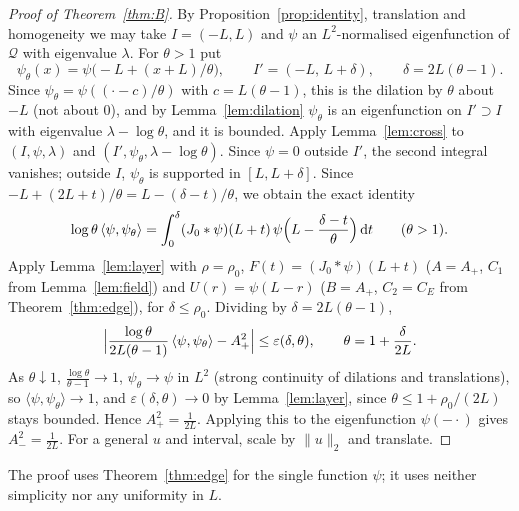 \documentclass[11pt]{amsart}
\newcommand{\eps}{\varepsilon}
\newcommand{\dd}{\,\mathrm{d}}
\theoremstyle{definition}
\theoremstyle{remark}
\numberwithin{equation}{section}
\begin{document}
\begin{proof}[Proof of Theorem~\ref{thm:B}]
By Proposition~\ref{prop:identity}, translation and homogeneity we may take $I=(-L,L)$ and $\psi$ an $L^2$-normalised eigenfunction of $\mathcal Q$ with eigenvalue $\lambda$. For $\theta>1$ put
\[
\psi_\theta(x)=\psi\bigl(-L+(x+L)/\theta\bigr),\qquad I'=(-L,\,L+\delta),\qquad\delta=2L(\theta-1).
\]
Since $\psi_\theta=\psi((\cdot-c)/\theta)$ with $c=L(\theta-1)$, this is the dilation by $\theta$ about $-L$ (not about $0$), and by Lemma~\ref{lem:dilation} $\psi_\theta$ is an eigenfunction on $I'\supset I$ with eigenvalue $\lambda-\log\theta$, and it is bounded. Apply Lemma~\ref{lem:cross} to $(I,\psi,\lambda)$ and $(I',\psi_\theta,\lambda-\log\theta)$. Since $\psi=0$ outside $I'$, the second integral vanishes; outside $I$, $\psi_\theta$ is supported in $[L,L+\delta]$. Since $-L+(2L+t)/\theta=L-(\delta-t)/\theta$, we obtain the exact identity
\begin{equation}\label{eq:dilation}
\log\theta\,\langle\psi,\psi_\theta\rangle=\int_0^\delta(J_0*\psi)(L+t)\,\psi\Bigl(L-\frac{\delta-t}\theta\Bigr)\dd t\qquad(\theta>1).
\end{equation}
Apply Lemma~\ref{lem:layer} with $\rho=\rho_0$, $F(t)=(J_0*\psi)(L+t)$ ($A=A_+$, $C_1$ from Lemma~\ref{lem:field}) and $U(r)=\psi(L-r)$ ($B=A_+$, $C_2=C_E$ from Theorem~\ref{thm:edge}), for $\delta\le\rho_0$. Dividing by $\delta=2L(\theta-1)$,
\[
\Bigl|\frac{\log\theta}{2L(\theta-1)}\,\langle\psi,\psi_\theta\rangle-A_+^2\Bigr|\le\eps(\delta,\theta),\qquad\theta=1+\frac\delta{2L}.
\]
As $\theta\downarrow1$, $\frac{\log\theta}{\theta-1}\to1$, $\psi_\theta\to\psi$ in $L^2$ (strong continuity of dilations and translations), so $\langle\psi,\psi_\theta\rangle\to1$, and $\eps(\delta,\theta)\to0$ by Lemma~\ref{lem:layer}, since $\theta\le1+\rho_0/(2L)$ stays bounded. Hence $A_+^2=\frac1{2L}$. Applying this to the eigenfunction $\psi(-\cdot)$ gives $A_-^2=\frac1{2L}$. For a general $u$ and interval, scale by $\|u\|_2$ and translate.
\end{proof}

The proof uses Theorem~\ref{thm:edge} for the single function $\psi$; it uses neither simplicity nor any uniformity in $L$.
\end{document}
